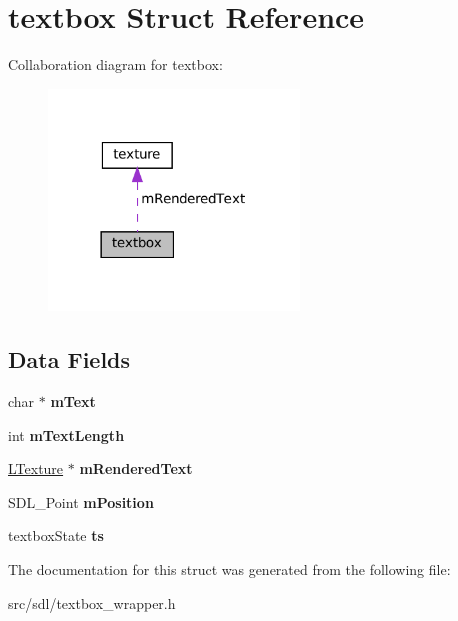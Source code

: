 \hypertarget{structtextbox}{}\section{textbox Struct Reference}
\label{structtextbox}


Collaboration diagram for textbox\+:
\nopagebreak
\begin{figure}[H]
\begin{center}
\leavevmode
\includegraphics[width=189pt]{structtextbox__coll__graph}
\end{center}
\end{figure}
\subsection*{Data Fields}
\begin{DoxyCompactItemize}
\item 
\mbox{\label{structtextbox_a7effa71f13f562fc3a9e174b4a3dd678}} 
char $\ast$ {\bfseries m\+Text}
\item 
\mbox{\label{structtextbox_afaf5ffcd96533dfa98e030421fcb78cc}} 
int {\bfseries m\+Text\+Length}
\item 
\mbox{\label{structtextbox_a55d71a9c7b9d9b59fd061fd732e5b673}} 
\hyperlink{structtexture}{L\+Texture} $\ast$ {\bfseries m\+Rendered\+Text}
\item 
\mbox{\label{structtextbox_a565fe26ba3de4ef01d9d6a4b6b6725d2}} 
S\+D\+L\+\_\+\+Point {\bfseries m\+Position}
\item 
\mbox{\label{structtextbox_aa7b1c5aa09d5a6d8db57bf1481aa83e0}} 
textbox\+State {\bfseries ts}
\end{DoxyCompactItemize}


The documentation for this struct was generated from the following file\+:\begin{DoxyCompactItemize}
\item 
src/sdl/textbox\+\_\+wrapper.\+h\end{DoxyCompactItemize}

